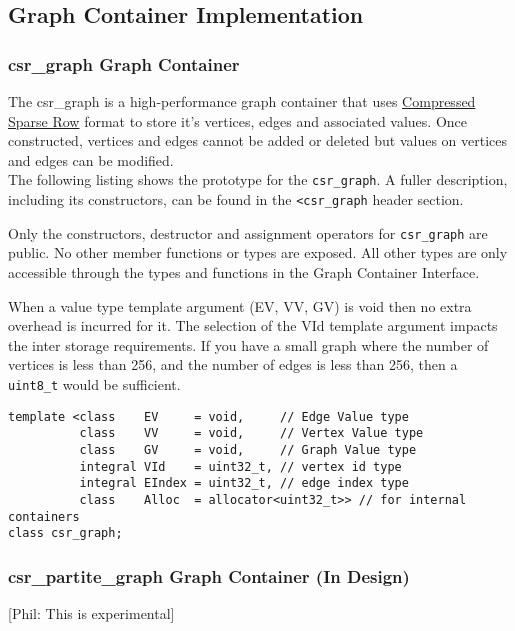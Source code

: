 \documentclass[10pt,onecolumn]{article}
\newcommand{\tcode}[1]{\lstinline[breaklines=true]{#1}}
\newcommand{\comment}[2]{{\color{comment}[{\sc #1:} \textsf{#2}]}}
\newcommand{\phil}[1]{\comment{Phil}{#1}}
\begin{document}
\subsection{Graph Container Implementation}

\subsubsection{csr\_graph Graph Container}
The csr\_graph is a high-performance graph container that uses \href{https://en.wikipedia.org/wiki/Sparse_matrix#Compressed_sparse_row_\%28CSR\%2C_CRS_or_Yale_format\%29}{Compressed Sparse Row} format to store it's vertices, edges and associated values. Once constructed, vertices and edges cannot be added or deleted but values on vertices and edges can be modified.
\\

The following listing shows the prototype for the \tcode{csr_graph}. A fuller description, including its constructors, can be found in the \tcode{<csr_graph} header section.

Only the constructors, destructor and assignment operators for \tcode{csr_graph} are public. No other member functions or types are exposed. All other types are only accessible through the types and functions in the Graph Container Interface.

When a value type template argument (EV, VV, GV) is void then no extra overhead is incurred for it. The selection of the VId template argument impacts the inter storage requirements. If you have a small graph where the number of vertices is less than 256, and the number of edges is less than 256, then a \tcode{uint8_t} would be sufficient.

\begin{lstlisting}
template <class    EV     = void,     // Edge Value type
          class    VV     = void,     // Vertex Value type
          class    GV     = void,     // Graph Value type
          integral VId    = uint32_t, // vertex id type
          integral EIndex = uint32_t, // edge index type
          class    Alloc  = allocator<uint32_t>> // for internal containers
class csr_graph;
\end{lstlisting}

\subsubsection{csr\_partite\_graph Graph Container (In Design)}
\phil{This is experimental}
\end{document}
